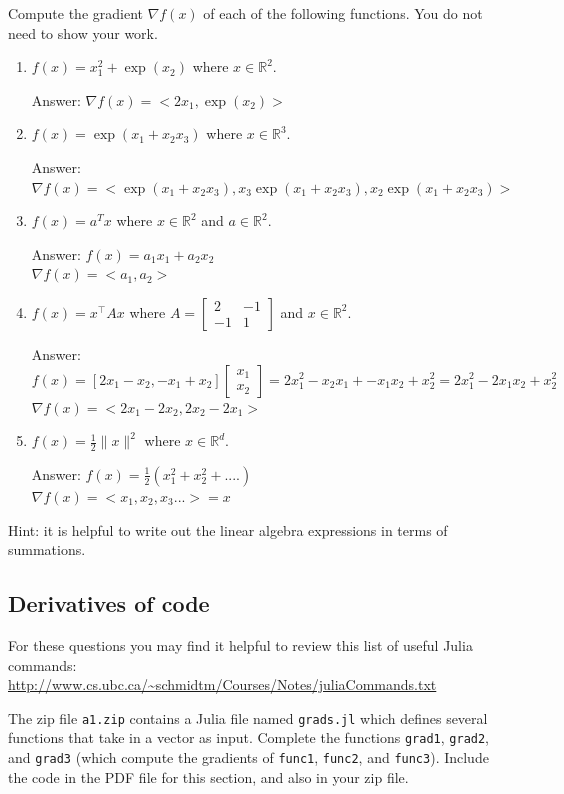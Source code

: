 \documentclass{article}
\def\ans#1{\par\gre{Answer: #1}}
\def\blu#1{{\color{blu}#1}}
\def\gre#1{{\color{gre}#1}}
\def\norm#1{\|#1\|}
\def\R{\mathbb{R}}
\begin{document}
\blu{Compute the gradient $\nabla f(x)$ of each of the following functions.} You do not need to show your work.
\begin{enumerate}
\item $f(x) = x_1^2 + \exp(x_2)$ where $x \in \R^2$.
\ans{$\nabla f(x) = <2x_1,\exp(x_2)>$}
\item $f(x) = \exp(x_1 + x_2x_3)$ where $x \in \mathbb{R}^3$.
\ans{$\nabla f(x) = <\exp(x_1+x_2x_3),x_3\exp(x_1+x_2x_3),x_2\exp(x_1+x_2x_3)>$}
\item $f(x) = a^Tx$ where $x \in \R^2$ and $a \in \R^2$.
\ans{$f(x) = a_1x_1+a_2x_2$\\$\nabla f(x) = <a_1,a_2> $}
\item $f(x) = x^\top A x$ where $A=\left[ \begin{array}{cc}
2 & -1 \\
 -1 & 1 \end{array} \right]$ and $x \in \mathbb{R}^2$.
\ans{$f(x) = [2x_1 - x_2, -x_1+x_2] \left[ \begin{array}{c}
    x_1\\x_2
 \end{array} \right] = 2x_1^2-x_2x_1+-x_1x_2+x_2^2 = 2x_1^2 - 2x_1x_2+x_2^2$\\
 $\nabla f(x) = <2x_1-2x_2,2x_2-2x_1>$
 } 
 \item $f(x) = \frac{1}{2}\norm{x}^2$ where $x \in \R^d$.
 \ans{$f(x) = \frac{1}{2}(x_1^2+x_2^2+....)$\\
 $\nabla f(x) = <x_1,x_2,x_3...> = x$
 }
\end{enumerate}

Hint: it is helpful to write out the linear algebra expressions in terms of summations.



\subsection{Derivatives of code}

For these questions you may find it helpful to review this list of useful Julia commands:\\
\url{http://www.cs.ubc.ca/~schmidtm/Courses/Notes/juliaCommands.txt}

The zip file \texttt{a1.zip} contains a Julia file named \texttt{grads.jl} which defines several functions that take in a vector as input. \blu{Complete the functions \texttt{grad1}, \texttt{grad2}, and \texttt{grad3} (which compute the gradients of \texttt{func1}, \texttt{func2}, and \texttt{func3})}. Include the code in the PDF file for this section, and also in your zip file.
\end{document}
